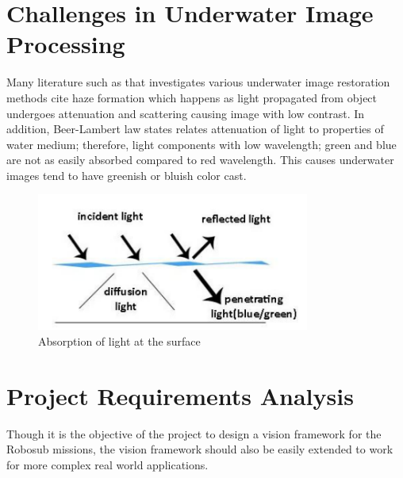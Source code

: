 \documentclass[fypca]{socreport}
\begin{document}
\section{Challenges in Underwater Image Processing}

Many literature such as  that investigates various underwater image restoration methods cite haze formation which happens as light propagated from object undergoes attenuation and scattering causing image with low contrast. In addition, Beer-Lambert law \cite{gevers2012color} states relates attenuation of light to properties of water medium; therefore, light components with low wavelength; green and blue are not as easily absorbed compared to red wavelength. This causes underwater images tend to have greenish or bluish color cast.

\begin{figure}[ht]
\centering

        \includegraphics[width=0.8\textwidth, height=0.2\textheight]{underwater_beerlambert.png}
        \caption{Absorption of light at the surface}
        \label{fig:water_surface_effect}

\end{figure}

\section{Project Requirements Analysis}
Though it is the objective of the project to design a vision framework for the Robosub missions, the vision framework should also be easily extended to work for more complex real world applications. 
\end{document}
